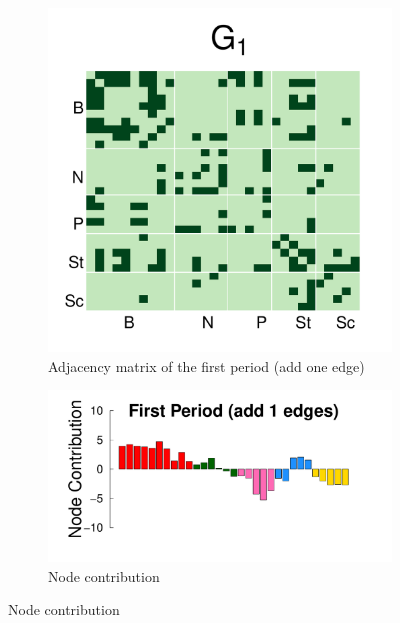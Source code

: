 \documentclass[12pt]{article}
\begin{document}
\begin{figure}[H]
	\centering
	\begin{subfigure}[b]{0.3\textwidth}
		\includegraphics[width=\textwidth]{../Figure/sim_Adj1.pdf}
		\caption{Adjacency matrix of the first period (add one edge)}
		\label{fig:step1}
	\end{subfigure}
	\begin{subfigure}[b]{0.6\textwidth}
		\includegraphics[width=\textwidth]{../Figure/step1.pdf}
		\caption{Node contribution}
		\label{fig:adj.step1}
	\end{subfigure}
\end{figure}
\end{document}
